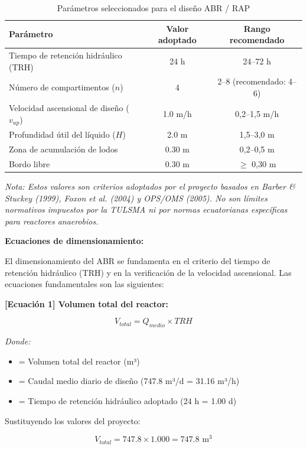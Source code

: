 \documentclass[12pt,a4paper]{article}
\begin{document}
\begin{table}[H]
\centering
\caption{Parámetros seleccionados para el diseño ABR / RAP}
\begin{tabular}{p{6cm}cc}
\toprule
\textbf{Parámetro} & \textbf{Valor adoptado} & \textbf{Rango recomendado} \\
\midrule
Tiempo de retención hidráulico (TRH) & 24 h & 24--72 h \\
Número de compartimentos ($n$) & 4 & 2--8 (recomendado: 4--6) \\
Velocidad ascensional de diseño ($v_{up}$) & 1.0 m/h & 0,2--1,5 m/h \\
Profundidad útil del líquido ($H$) & 2.0 m & 1,5--3,0 m \\
Zona de acumulación de lodos & 0.30 m & 0,2--0,5 m \\
Bordo libre & 0.30 m & $\geq$ 0,30 m \\
\bottomrule
\end{tabular}
\end{table}

\textit{Nota: Estos valores son criterios adoptados por el proyecto basados en Barber \& Stuckey (1999), Foxon et al. (2004) y OPS/OMS (2005). No son límites normativos impuestos por la TULSMA ni por normas ecuatorianas específicas para reactores anaerobios.}

\textbf{Ecuaciones de dimensionamiento:}

El dimensionamiento del ABR se fundamenta en el criterio del tiempo de retención hidráulico (TRH) y en la verificación de la velocidad ascensional. Las ecuaciones fundamentales son las siguientes:

\textbf{[Ecuación 1] Volumen total del reactor:}

\begin{equation}
V_{total} = Q_{medio} \times TRH
\end{equation}

\textit{Donde:}
\begin{itemize}[noitemsep,leftmargin=2em]
    \item[$V_{total}$] = Volumen total del reactor (m³)
    \item[$Q_{medio}$] = Caudal medio diario de diseño (747.8 m³/d = 31.16 m³/h)
    \item[$TRH$] = Tiempo de retención hidráulico adoptado (24 h = 1.00 d)
\end{itemize}

Sustituyendo los valores del proyecto:

\begin{equation}
V_{total} = 747.8 \times 1.000 = 747.8 \text{ m}^3
\end{equation}
\end{document}
